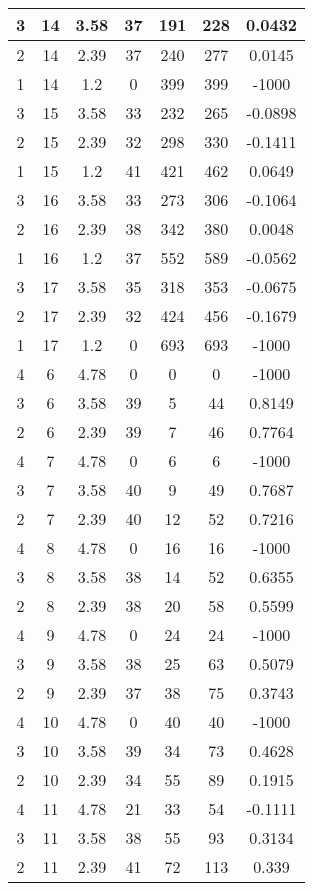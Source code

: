 \documentclass[letterpaper, 12pt]{article}
\begin{document}
\begin{longtable}{|c|c|c|c|c|c|c|}
\hline
3 & 14 & 3.58 & 37 & 191 & 228 & 0.0432 \\
\hline
2 & 14 & 2.39 & 37 & 240 & 277 & 0.0145 \\
\hline
1 & 14 & 1.2 & 0 & 399 & 399 & -1000 \\
\hline
3 & 15 & 3.58 & 33 & 232 & 265 & -0.0898 \\
\hline
2 & 15 & 2.39 & 32 & 298 & 330 & -0.1411 \\
\hline
1 & 15 & 1.2 & 41 & 421 & 462 & 0.0649 \\
\hline
3 & 16 & 3.58 & 33 & 273 & 306 & -0.1064 \\
\hline
2 & 16 & 2.39 & 38 & 342 & 380 & 0.0048 \\
\hline
1 & 16 & 1.2 & 37 & 552 & 589 & -0.0562 \\
\hline
3 & 17 & 3.58 & 35 & 318 & 353 & -0.0675 \\
\hline
2 & 17 & 2.39 & 32 & 424 & 456 & -0.1679 \\
\hline
1 & 17 & 1.2 & 0 & 693 & 693 & -1000 \\
\hline
4 & 6 & 4.78 & 0 & 0 & 0 & -1000 \\
\hline
3 & 6 & 3.58 & 39 & 5 & 44 & 0.8149 \\
\hline
2 & 6 & 2.39 & 39 & 7 & 46 & 0.7764 \\
\hline
4 & 7 & 4.78 & 0 & 6 & 6 & -1000 \\
\hline
3 & 7 & 3.58 & 40 & 9 & 49 & 0.7687 \\
\hline
2 & 7 & 2.39 & 40 & 12 & 52 & 0.7216 \\
\hline
4 & 8 & 4.78 & 0 & 16 & 16 & -1000 \\
\hline
3 & 8 & 3.58 & 38 & 14 & 52 & 0.6355 \\
\hline
2 & 8 & 2.39 & 38 & 20 & 58 & 0.5599 \\
\hline
4 & 9 & 4.78 & 0 & 24 & 24 & -1000 \\
\hline
3 & 9 & 3.58 & 38 & 25 & 63 & 0.5079 \\
\hline
2 & 9 & 2.39 & 37 & 38 & 75 & 0.3743 \\
\hline
4 & 10 & 4.78 & 0 & 40 & 40 & -1000 \\
\hline
3 & 10 & 3.58 & 39 & 34 & 73 & 0.4628 \\
\hline
2 & 10 & 2.39 & 34 & 55 & 89 & 0.1915 \\
\hline
4 & 11 & 4.78 & 21 & 33 & 54 & -0.1111 \\
\hline
3 & 11 & 3.58 & 38 & 55 & 93 & 0.3134 \\
\hline
2 & 11 & 2.39 & 41 & 72 & 113 & 0.339 \\

\end{longtable}
\end{document}
